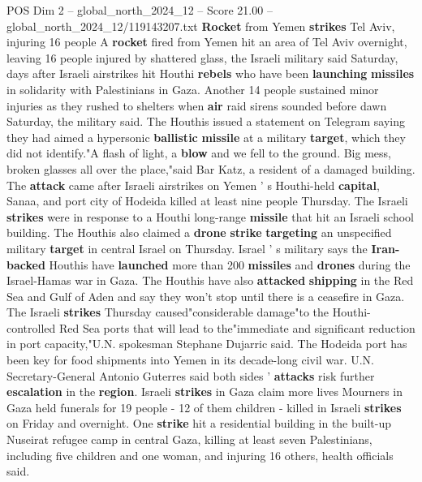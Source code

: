 \begin{textsample}{POS Dim 2 – global\_north\_2024\_12 – Score 21.00 – global\_north\_2024\_12/119143207.txt}  \label{ex:f2_pos_273}
\textbf{Rocket} from Yemen \textbf{strikes} Tel Aviv, injuring 16 people A \textbf{rocket} fired from Yemen hit an area of Tel Aviv overnight, leaving 16 people injured by shattered glass, the Israeli military said Saturday, days after Israeli airstrikes hit Houthi \textbf{rebels} who have been \textbf{launching} \textbf{missiles} in solidarity with Palestinians in Gaza.
Another 14 people sustained minor injuries as they rushed to shelters when \textbf{air} raid sirens sounded before dawn Saturday, the military said.
The Houthis issued a statement on Telegram saying they had aimed a hypersonic \textbf{ballistic} \textbf{missile} at a military \textbf{target}, which they did not identify."A flash of light, a \textbf{blow} and we fell to the ground.
Big mess, broken glasses all over the place,"said Bar Katz, a resident of a damaged building.
The \textbf{attack} came after Israeli airstrikes on Yemen ' s Houthi-held \textbf{capital}, Sanaa, and port city of Hodeida killed at least nine people Thursday.
The Israeli \textbf{strikes} were in response to a Houthi long-range \textbf{missile} that hit an Israeli school building.
The Houthis also claimed a \textbf{drone} \textbf{strike} \textbf{targeting} an unspecified military \textbf{target} in central Israel on Thursday.
Israel ' s military says the \textbf{Iran-backed} Houthis have \textbf{launched} more than 200 \textbf{missiles} and \textbf{drones} during the Israel-Hamas war in Gaza.
The Houthis have also \textbf{attacked} \textbf{shipping} in the Red Sea and Gulf of Aden and say they won't stop until there is a ceasefire in Gaza.
The Israeli \textbf{strikes} Thursday caused"considerable damage"to the Houthi-controlled Red Sea ports that will lead to the"immediate and significant reduction in port capacity,"U.N. spokesman Stephane Dujarric said.
The Hodeida port has been key for food shipments into Yemen in its decade-long civil war.
U.N.
Secretary-General Antonio Guterres said both sides ' \textbf{attacks} risk further \textbf{escalation} in the \textbf{region}.
Israeli \textbf{strikes} in Gaza claim more lives Mourners in Gaza held funerals for 19 people - 12 of them children - killed in Israeli \textbf{strikes} on Friday and overnight.
One \textbf{strike} hit a residential building in the built-up Nuseirat refugee camp in central Gaza, killing at least seven Palestinians, including five children and one woman, and injuring 16 others, health officials said.

\end{textsample}
